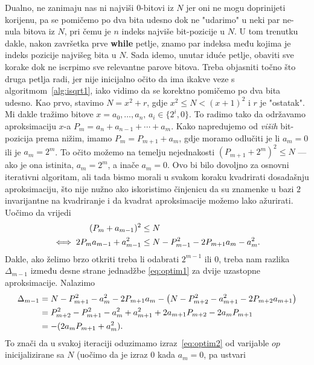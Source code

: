 \documentclass[12pt]{scrartcl}
\begin{document}
Dualno, ne zanimaju nas ni najviši $0$-bitovi iz $N$ jer oni ne mogu doprinijeti korijenu, pa se pomičemo po dva bita udesno dok ne "udarimo" u neki 
par ne-nula bitova iz $N$, pri čemu je $n$ indeks najviše bit-pozicije u $N$. U tom trenutku dakle, nakon završetka prve \textbf{while} petlje,
znamo par indeksa među kojima je indeks pozicije najvišeg bita u $N$. Sada idemo, unutar iduće petlje, obaviti sve korake dok ne iscrpimo
sve relevantne parove bitova. Treba objasniti točno što druga petlja radi, jer nije inicijalno očito da ima ikakve veze s algoritmom~\ref{alg:isqrt1},
iako vidimo da se korektno pomičemo po dva bita udesno. Kao prvo, stavimo $N=x^2+r$, gdje $x^2\leq N < (x+1)^2$ i $r$ je "ostatak".
Mi dakle tražimo bitove $x=a_0,\dotsc ,a_n,\,a_i\in\{2^i,0\}$. To radimo tako da održavamo aproksimaciju $x$-a $P_m=a_n+a_{n-1}+\dotsb+a_m$.
Kako napredujemo od \emph{viših} bit-pozicija prema nižim, imamo $P_m=P_{m+1}+a_m$, gdje moramo odlučiti je li $a_m=0$ ili je $a_m=2^m$.
To očito možemo na temelju nejednakosti $(P_{m+1}+2^m)^2 \leq N$ --- ako je ona istinita, $a_m=2^m$, a inače $a_m=0$. Ovo bi bilo dovoljno za
osnovni iterativni algoritam, ali tada bismo morali u svakom koraku kvadrirati dosadašnju aproksimaciju, što nije nužno ako iskoristimo činjenicu
da su znamenke u bazi $2$ invarijantne na kvadriranje i da kvadrat aproksimacije možemo lako ažurirati. Uočimo da vrijedi
\begin{equation}\label{eq:optim1}
    \begin{aligned}
    (P_m+a_{m-1})^2 &\leq N\\
    \iff 2P_ma_{m-1}+a^2_{m-1} &\leq N-P^2_{m-1}-2P_{m+1}a_m-a^2_m\text.
    \end{aligned}
\end{equation}
Dakle, ako želimo brzo otkriti treba li odabrati $2^{m-1}$ ili $0$, treba nam razlika $\Delta_{m-1}$ između desne strane jednadžbe \eqref{eq:optim1}
za dvije uzastopne aproksimacije. Nalazimo
\begin{equation}\label{eq:optim2}
    \begin{aligned}
    \Delta_{m-1}&=N-P^2_{m+1}-a^2_m-2P_{m+1}a_m-\left(N-P^2_{m+2}-a^2_{m+1}-2P_{m+2}a_{m+1}\right)\\
    &=P^2_{m+2}-P^2_{m+1}-a^2_m+a^2_{m+1}+2a_{m+1}P_{m+2}-2a_mP_{m+1}\\
    &=-(2a_mP_{m+1}+a^2_m)\text.
    \end{aligned}
\end{equation}
To znači da u svakoj iteraciji oduzimamo izraz~\eqref{eq:optim2} od varijable $op$ inicijalizirane sa $N$ (uočimo da je izraz $0$ kada $a_m=0$, pa ustvari
\end{document}
